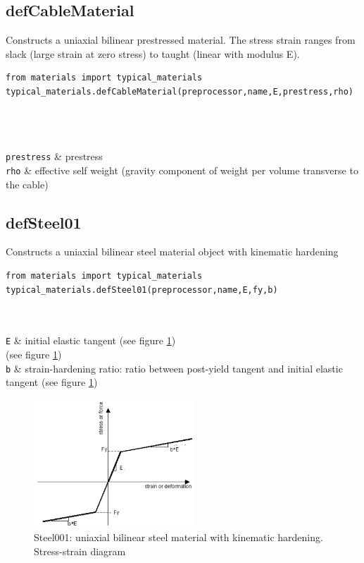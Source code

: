 \subsection{defCableMaterial}
\noindent Constructs a uniaxial bilinear prestressed material. The stress strain ranges from slack (large strain at zero stress) to taught (linear with modulus E).
\begin{verbatim}
from materials import typical_materials
typical_materials.defCableMaterial(preprocessor,name,E,prestress,rho)
\end{verbatim}
\begin{paramFuncTable}
\preprocessor{} \\
 \\
\E{} \\
{\tt prestress} & prestress \\
{\tt rho} & effective self weight (gravity component of weight per volume transverse to the cable) \\
\end{paramFuncTable}


\subsection{defSteel01}
\noindent Constructs a uniaxial bilinear steel material object with kinematic hardening
\begin{verbatim}
from materials import typical_materials
typical_materials.defSteel01(preprocessor,name,E,fy,b)
\end{verbatim}
\begin{paramFuncTable}
\preprocessor{} \\
 \\
{\tt E} & initial elastic tangent (see figure \ref{Steel01}) \\
\fy{} (see figure \ref{Steel01})\\
{\tt b} &  strain-hardening ratio: ratio between post-yield tangent and initial elastic tangent (see figure \ref{Steel01})\\
\end{paramFuncTable}


\begin{figure}[h]
\centering
\includegraphics[width=60mm]{materials/figures/Steel01}
\caption{Steel001: uniaxial bilinear steel material with kinematic hardening. Stress-strain diagram}\label{Steel01}
\end{figure}


